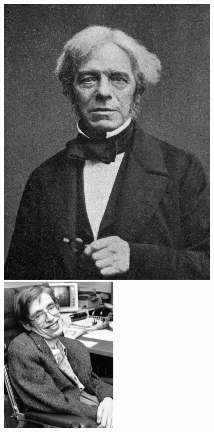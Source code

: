 \documentclass[crop=false]{standalone}
\begin{document}
\begin{figure}[H]
    \includegraphics[width=\linewidth]{images/michael-faraday.jpeg}
  \endminipage\hfill
    \includegraphics[width=\linewidth]{images/stephen-hawking.jpg}
  \endminipage
\end{figure}
\end{document}
